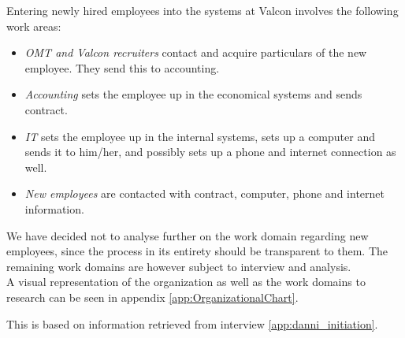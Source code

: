 Entering newly hired employees into the systems at Valcon involves the following work areas:

\begin{itemize}
\item \emph{OMT and Valcon recruiters} contact and acquire particulars of the new employee. They send this to accounting.
\item \emph{Accounting} sets the employee up in the economical systems and sends contract.
\item \emph{IT} sets the employee up in the internal systems, sets up a computer and sends it to him/her, and possibly sets up a phone and internet connection as well.
\item \emph{New employees} are contacted with contract, computer, phone and internet information. 
\end{itemize}

We have decided not to analyse further on the work domain regarding new employees, since the process in its entirety should be transparent to them.
The remaining work domains are however subject to interview and analysis. \\

A visual representation of the organization as well as the work domains to research can be seen in appendix \ref{app:OrganizationalChart}.

This is based on information retrieved from interview \ref{app:danni_initiation}.